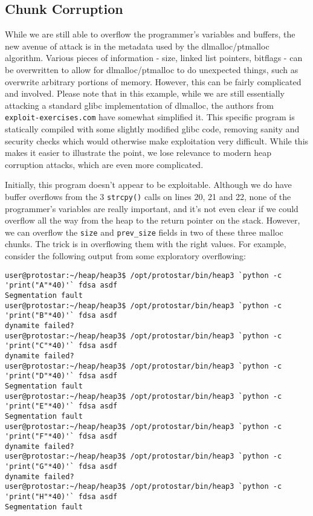 \subsection{Chunk Corruption}
While we are still able to overflow the programmer's variables and
buffers, the new avenue of attack is in the metadata used by the
dlmalloc/ptmalloc algorithm. Various pieces of information - size,
linked list pointers, bitflags - can be overwritten to allow for
dlmalloc/ptmalloc to do unexpected things, such as overwrite 
arbitrary portions of memory. However, this can be fairly 
complicated and involved. Please note that in this example, while
we are still essentially attacking a standard glibc implementation of dlmalloc,
the authors from \texttt{exploit-exercises.com} have somewhat simplified it.
This specific program is statically compiled with some slightly modified
glibc code, removing sanity and security checks which would otherwise
make exploitation very difficult. While this makes it easier to illustrate
the point, we lose relevance to modern heap corruption attacks, which are
even more complicated.



Initially, this program doesn't appear to be exploitable. Although
we do have buffer overflows from the 3 \texttt{strcpy()} calls on
lines 20, 21 and 22, none of the programmer's variables are really
important, and it's not even clear if we could overflow all the
way from the heap to the return pointer on the stack. However,
we can overflow the \texttt{size} and \texttt{prev\_size} fields
in two of these three malloc chunks. The trick is in overflowing
them with the right values. For example, consider the following
output from some exploratory overflowing:

\begin{lstlisting}
user@protostar:~/heap/heap3$ /opt/protostar/bin/heap3 `python -c 'print("A"*40)'` fdsa asdf
Segmentation fault
user@protostar:~/heap/heap3$ /opt/protostar/bin/heap3 `python -c 'print("B"*40)'` fdsa asdf
dynamite failed?
user@protostar:~/heap/heap3$ /opt/protostar/bin/heap3 `python -c 'print("C"*40)'` fdsa asdf
dynamite failed?
user@protostar:~/heap/heap3$ /opt/protostar/bin/heap3 `python -c 'print("D"*40)'` fdsa asdf
Segmentation fault
user@protostar:~/heap/heap3$ /opt/protostar/bin/heap3 `python -c 'print("E"*40)'` fdsa asdf
Segmentation fault
user@protostar:~/heap/heap3$ /opt/protostar/bin/heap3 `python -c 'print("F"*40)'` fdsa asdf
dynamite failed?
user@protostar:~/heap/heap3$ /opt/protostar/bin/heap3 `python -c 'print("G"*40)'` fdsa asdf
dynamite failed?
user@protostar:~/heap/heap3$ /opt/protostar/bin/heap3 `python -c 'print("H"*40)'` fdsa asdf
Segmentation fault
\end{lstlisting}

